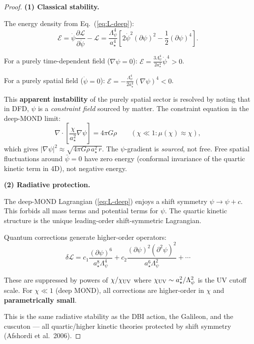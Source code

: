 \documentclass[11pt,a4paper]{article}
\begin{document}
\begin{proof}
\textbf{(1) Classical stability.}

The energy density from Eq.~(\ref{eq:L-deep}):
\begin{equation}
\mathcal{E} = \dot\psi\frac{\partial\mathcal{L}}{\partial\dot\psi} - \mathcal{L} = \frac{\Lambda_\psi^4}{a_\star^4}\left[2\dot\psi^2(\partial\psi)^2 - \frac{1}{2}(\partial\psi)^4\right].
\end{equation}

For a purely time-dependent field ($\nabla\psi = 0$): $\mathcal{E} = \frac{3\Lambda_\psi^4}{2a_\star^4}\dot\psi^4 > 0$.

For a purely spatial field ($\dot\psi = 0$): $\mathcal{E} = -\frac{\Lambda_\psi^4}{2a_\star^4}(\nabla\psi)^4 < 0$.

This \textbf{apparent instability} of the purely spatial sector is resolved by noting that in DFD, $\psi$ is a \emph{constraint field} sourced by matter. The constraint equation in the deep-MOND limit:
\begin{equation}
\nabla\cdot\left[\frac{\chi}{a_\star^2}\nabla\psi\right] = 4\pi G\rho \qquad (\chi \ll 1: \mu(\chi) \approx \chi),
\end{equation}
which gives $|\nabla\psi|^2 \approx \sqrt{4\pi G\rho\,a_\star^2\,r}$. The $\psi$-gradient is \emph{sourced}, not free. Free spatial fluctuations around $\bar\psi = 0$ have zero energy (conformal invariance of the quartic kinetic term in 4D), not negative energy.

\textbf{(2) Radiative protection.}

The deep-MOND Lagrangian (\ref{eq:L-deep}) enjoys a shift symmetry $\psi \to \psi + c$. This forbids all mass terms and potential terms for $\psi$. The quartic kinetic structure is the unique leading-order shift-symmetric Lagrangian.

Quantum corrections generate higher-order operators:
\begin{equation}
\delta\mathcal{L} = c_1 \frac{(\partial\psi)^6}{a_\star^8 \Lambda_\psi^4} + c_2 \frac{(\partial\psi)^2 (\partial^2\psi)^2}{a_\star^6 \Lambda_\psi^2} + \cdots
\end{equation}

These are suppressed by powers of $\chi/\chi_{\rm UV}$ where $\chi_{\rm UV} \sim a_\star^2/\Lambda_\psi^2$ is the UV cutoff scale. For $\chi \ll 1$ (deep MOND), all corrections are higher-order in $\chi$ and \textbf{parametrically small}.

This is the same radiative stability as the DBI action, the Galileon, and the cuscuton --- all quartic/higher kinetic theories protected by shift symmetry (Afshordi et al.\ 2006).


\end{proof}
\end{document}
